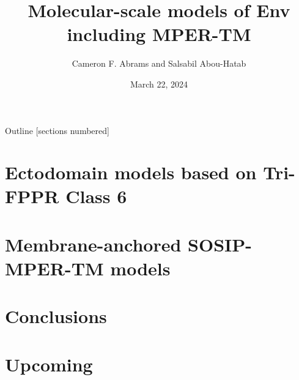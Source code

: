 \documentclass[10pt]{beamer}
\title{Molecular-scale models of Env including MPER-TM}
\date{March 22, 2024}
\author{Cameron F. Abrams and Salsabil Abou-Hatab}
\institute{Drexel University, Department of Chemical and Biological Engineering}
\begin{document}
\maketitle
\begin{frame}{Outline}
  [sections numbered]
  \tableofcontents[hideallsubsections]
\end{frame}

\section{Ectodomain models based on Tri-FPPR Class 6}











\section{Membrane-anchored SOSIP-MPER-TM models}



\section{Conclusions}


\section{Upcoming}





% 
\end{document}
